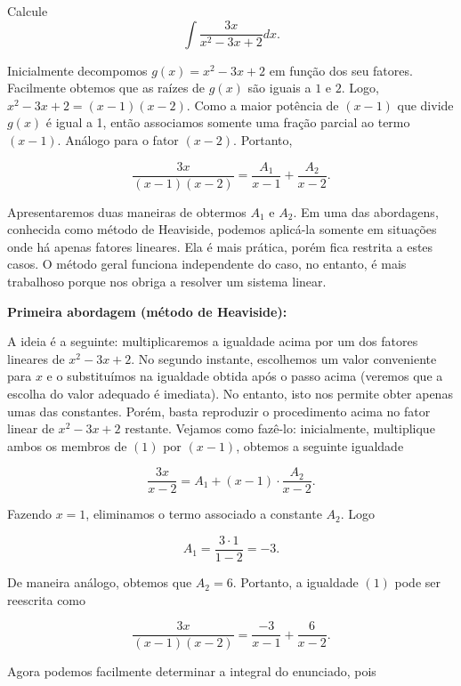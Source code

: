 	\begin{ex}
		Calcule $$\int \frac{3x}{x^2 - 3x +2}dx.$$
		
		Inicialmente decompomos  $g(x) = x^2 - 3x +2$ em função dos seu fatores. Facilmente obtemos que as raízes de $g(x)$ são iguais a $1$ e $2$. Logo, $x^2 - 3x +2 = (x-1)(x-2)$. Como a maior potência de $(x-1)$ que divide $g(x)$ é igual a 1, então associamos somente uma fração parcial ao termo $(x-1)$. Análogo para o fator $(x-2)$. Portanto,
		
		\begin{equation}
			\frac{3x}{(x-1)(x-2)} = \frac{A_1}{x-1} + \frac{A_2}{x-2}.
			\tag{1}
		\end{equation}
		
		Apresentaremos duas maneiras de obtermos $A_1$ e $A_2$. Em uma das abordagens, conhecida como método de Heaviside, podemos aplicá-la somente em situações onde há apenas fatores lineares. Ela é mais prática, porém fica restrita a estes casos. O método geral funciona independente do caso, no entanto, é mais trabalhoso porque nos obriga a resolver um sistema linear.\\ 
		
		\begin{flushleft}
			\textbf{Primeira abordagem (método de Heaviside):}
		\end{flushleft}
		
		A ideia é a seguinte: multiplicaremos a igualdade acima por um dos fatores lineares de $x^2 - 3x +2$. No segundo instante, escolhemos um valor conveniente para $x$ e o substituímos na igualdade obtida após o passo acima (veremos que a escolha do valor adequado é imediata). No entanto, isto nos permite obter apenas umas das constantes. Porém, basta reproduzir o procedimento acima no fator linear de $x^2 - 3x +2$ restante. Vejamos como fazê-lo: inicialmente, multiplique ambos os membros de $(1)$ por $(x-1)$, obtemos a seguinte igualdade
		
		$$\frac{3x}{x-2} = A_1 + (x-1) \cdot \frac{A_2}{x-2}.$$
		
		Fazendo $x = 1$, eliminamos o termo associado a constante $A_2$. Logo
		
		$$A_1 = \frac{3 \cdot 1}{1 - 2} = -3.$$
		
		De maneira análogo, obtemos que $A_2 = 6$. Portanto, a igualdade $(1)$ pode ser reescrita como
		
		$$ \frac{3x}{(x-1)(x-2)} = \frac{-3}{x-1} + \frac{6}{x-2}.$$
		
		Agora podemos facilmente determinar a integral do enunciado, pois
		

\end{ex}
